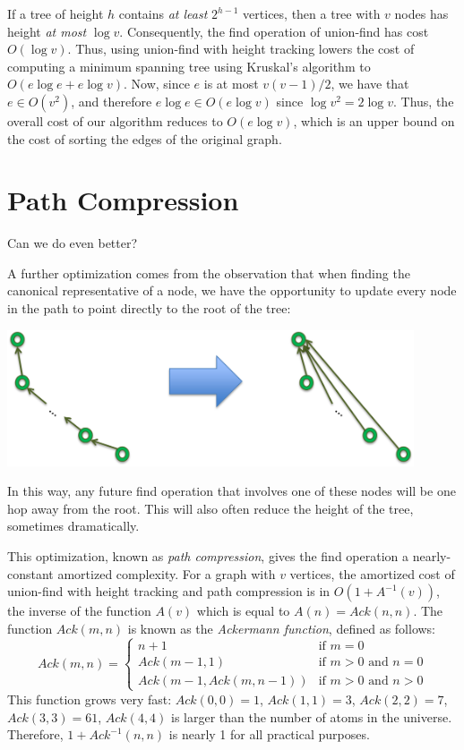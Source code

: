 If a tree of height $h$ contains \emph{at least} $2^{h-1}$ vertices,
then a tree with $v$ nodes has height \emph{at most} $\log v$.
Consequently, the find operation of union-find has cost $O(\log v)$.
Thus, using union-find with height tracking lowers the cost of
computing a minimum spanning tree using Kruskal's algorithm to $O(e
\log e + e \log v)$.  Now, since $e$ is at most $v(v-1)/2$, we have
that $e \in O(v^2)$, and therefore $e \log e \in O(e \log v)$ since
$\log v^2 = 2\log v$.  Thus, the overall cost of our algorithm reduces
to $O(e \log v)$, which is an upper bound on the cost of sorting the
edges of the original graph.


\section{Path Compression}
\label{sec:unionfind:path_compression}

Can we do even better?

A further optimization comes from the observation that when finding
the canonical representative of a node, we have the opportunity to
update every node in the path to point directly to the root of the
tree:
\begin{center}
  \includegraphics[width=0.9\textwidth]{img/ufg-pc.png}
\end{center}
In this way, any future find operation that involves one of these
nodes will be one hop away from the root.  This will also often
reduce the height of the tree, sometimes dramatically.

This optimization, known as \emph{path compression}, gives the find
operation a nearly-constant amortized complexity.  For a graph with
$v$ vertices, the amortized cost of union-find with height tracking
and path compression is in $O(1 + A^{-1}(v))$, the inverse of the
function $A(v)$ which is equal to $A(n) = \mathit{Ack}(n,n)$.  The function
$\mathit{Ack}(m,n)$ is known as the \emph{Ackermann function}, defined as
follows:
$$
\mathit{Ack}(m,n) =
\left\{
\begin{array}{ll}
   n+1 & \text{if } m=0
\\ \mathit{Ack}(m-1, 1) & \text{if } m > 0 \text{ and } n = 0
\\ \mathit{Ack}(m-1, \mathit{Ack}(m,n-1)) & \text{if } m > 0 \text{ and } n > 0
\end{array}
\right.
$$
This function grows very fast: $\mathit{Ack}(0,0) = 1$, $\mathit{Ack}(1,1) = 3$, $\mathit{Ack}(2,2) =
7$, $\mathit{Ack}(3,3) = 61$, $\mathit{Ack}(4,4)$ is larger than the number of
atoms in the universe.  Therefore, $1 + \mathit{Ack}^{-1}(n,n)$ is nearly 1 for all
practical purposes.



